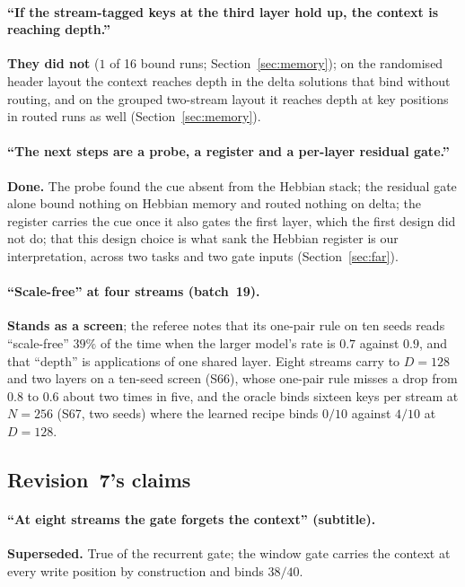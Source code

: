 \documentclass[11pt]{article}
\begin{document}
\paragraph{``If the stream-tagged keys at the third layer hold up, the context is reaching depth.''} \textbf{They did not} ($1$ of 16 bound runs; Section~\ref{sec:memory}); on the randomised header layout the context reaches depth in the delta solutions that bind without routing, and on the grouped two-stream layout it reaches depth at key positions in routed runs as well (Section~\ref{sec:memory}).

\paragraph{``The next steps are a probe, a register and a per-layer residual gate.''} \textbf{Done.} The probe found the cue absent from the Hebbian stack; the residual gate alone bound nothing on Hebbian memory and routed nothing on delta; the register carries the cue once it also gates the first layer, which the first design did not do; that this design choice is what sank the Hebbian register is our interpretation, across two tasks and two gate inputs (Section~\ref{sec:far}).

\paragraph{``Scale-free'' at four streams (batch~19).} \textbf{Stands as a screen}; the referee notes that its one-pair rule on ten seeds reads ``scale-free'' $39\%$ of the time when the larger model's rate is $0.7$ against $0.9$, and that ``depth'' is applications of one shared layer. Eight streams carry to $D = 128$ and two layers on a ten-seed screen (S66), whose one-pair rule misses a drop from $0.8$ to $0.6$ about two times in five, and the oracle binds sixteen keys per stream at $N = 256$ (S67, two seeds) where the learned recipe binds $0/10$ against $4/10$ at $D = 128$.

\subsection{Revision~7's claims}

\paragraph{``At eight streams the gate forgets the context'' (subtitle).} \textbf{Superseded.} True of the recurrent gate; the window gate carries the context at every write position by construction and binds $38/40$.
\end{document}
